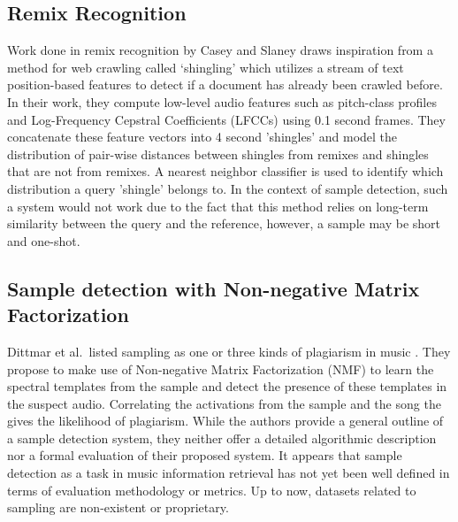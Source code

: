 \documentclass{article}
\begin{document}
\subsection{Remix Recognition}
Work done in remix recognition by Casey and Slaney \cite{caseyRemix} draws inspiration from a method for web crawling called `shingling' which utilizes a stream of text position-based features to detect if a document has already been crawled before. In their work, they compute low-level audio features such as pitch-class profiles and Log-Frequency Cepstral Coefficients (LFCCs) using 0.1 second frames. They concatenate these feature vectors into 4 second 'shingles' and model the distribution of pair-wise distances between shingles from remixes and shingles that are not from remixes. A nearest neighbor classifier is used to identify which distribution a query 'shingle' belongs to. In the context of sample detection, such a system would not work due to the fact that this method relies on long-term similarity between the query and the reference, however, a sample may be short and one-shot.

\subsection{Sample detection with Non-negative Matrix Factorization}
%
Dittmar et al.\ listed sampling as one or three kinds of plagiarism in music \cite{dittmar2012audio}. They propose to make use of Non-negative Matrix Factorization (NMF) to learn the spectral templates from the sample and detect the presence of these templates in the suspect audio. Correlating the activations from the sample and the song the gives the likelihood of plagiarism.
%
While the authors provide a general outline of a sample detection system, they neither offer a detailed algorithmic description nor a formal evaluation of their proposed system. It appears that sample detection as a task in music information retrieval has not yet been well defined in terms of evaluation methodology or metrics. Up to now, datasets related to sampling are non-existent or proprietary.
\end{document}
